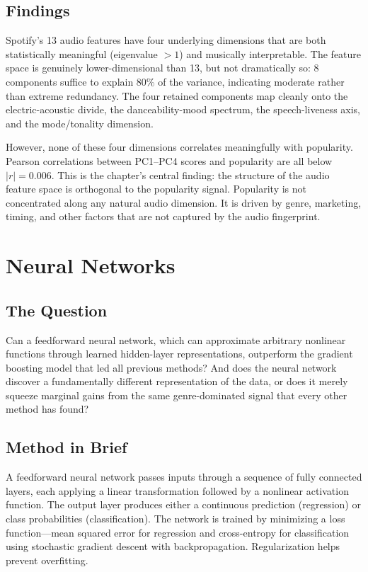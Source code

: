 \documentclass[12pt, oneside]{book}
\begin{document}
\section{Findings}
 
Spotify's 13 audio features have four underlying dimensions that are both statistically meaningful (eigenvalue $> 1$) and musically interpretable. The feature space is genuinely lower-dimensional than 13, but not dramatically so: 8 components suffice to explain 80\% of the variance, indicating moderate rather than extreme redundancy. The four retained components map cleanly onto the electric-acoustic divide, the danceability-mood spectrum, the speech-liveness axis, and the mode/tonality dimension.
 
However, none of these four dimensions correlates meaningfully with popularity. Pearson correlations between PC1--PC4 scores and popularity are all below $|r| = 0.006$. This is the chapter's central finding: the structure of the audio feature space is orthogonal to the popularity signal. Popularity is not concentrated along any natural audio dimension. It is driven by genre, marketing, timing, and other factors that are not captured by the audio fingerprint.
 
\chapter{Neural Networks}
 
\section{The Question}
 
Can a feedforward neural network, which can approximate arbitrary nonlinear functions through learned hidden-layer representations, outperform the gradient boosting model that led all previous methods? And does the neural network discover a fundamentally different representation of the data, or does it merely squeeze marginal gains from the same genre-dominated signal that every other method has found?
 
\section{Method in Brief}
 
A feedforward neural network passes inputs through a sequence of fully connected layers, each applying a linear transformation followed by a nonlinear activation function. The output layer produces either a continuous prediction (regression) or class probabilities (classification). The network is trained by minimizing a loss function—mean squared error for regression and cross-entropy for classification using stochastic gradient descent with backpropagation. Regularization helps prevent overfitting.
 
\end{document}
